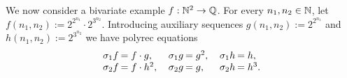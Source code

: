 \begin{example}
    \label{ex:polyrec 1}
    We now consider a bivariate example $f : \mathbb N^2 \to \mathbb Q$.
    For every $n_1, n_2 \in \mathbb N$, let 
    $f(n_1, n_2) := 2^{2^{n_1}} \cdot 2^{3^{n_2}}$.
    Introducing auxiliary sequences $g(n_1, n_2) := 2^{2^{n_1}}$ and $h(n_1, n_2) := 2^{3^{n_2}}$
    we have polyrec equations
    \begin{align*}
        \arraycolsep=1pt
        \begin{array}{rl}
            \shift 1 f &= f \cdot g, \\
            \shift 2 f &= f \cdot h^2,
        \end{array}
        \quad
        \begin{array}{rl}
            \shift 1 g &= g^2, \\
            \shift 2 g &= g,
        \end{array}
        \quad
        \begin{array}{rl}
            \shift 1 h &= h, \\
            \shift 2 h &= h^3.
        \end{array}
    \end{align*}
\end{example}

